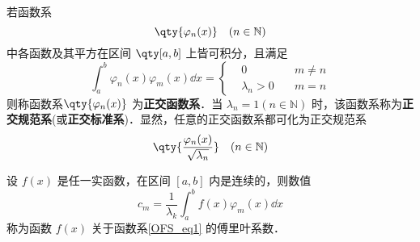 
若函数系 
\begin{equation}\label{OFS_eq1}
\qty{\varphi_n(x)}\quad(n\in \mathbb{N})
\end{equation}
中各函数及其平方在区间 $\qty[a,b]$ 上皆可积分，且满足
\begin{equation}
\int_a^b\varphi_n(x)\varphi_m(x)\dd x=
\left\{
    \begin{aligned}
    &0\quad &m\neq n\\
   &\lambda_n>0\quad &m=n
    \end{aligned}
\right.
\end{equation}
则称函数系$\qty{\varphi_n(x)}$ 为\textbf{正交函数系}．当 $\lambda_n=1(n\in\mathbb{N})$ 时，该函数系称为\textbf{正交规范系}(或\textbf{正交标准系})．显然，任意的正交函数系都可化为正交规范系 
\begin{equation}
\qty{\frac{\varphi_n(x)}{\sqrt{\lambda_n}}}\quad(n\in \mathbb{N})
\end{equation}

设 $f(x)$ 是任一实函数，在区间 $[a,b]$ 内是连续的，则数值
\begin{equation}
c_m=\frac{1}{\lambda_k}\int_a^b f(x)\varphi_m(x)\dd x
\end{equation}
称为函数 $f(x)$ 关于函数系\autoref{OFS_eq1} 的傅里叶系数．




